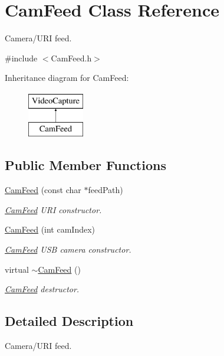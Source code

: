 \hypertarget{classCamFeed}{}\section{Cam\+Feed Class Reference}
\label{classCamFeed}


Camera/\+U\+R\+I feed.  




{\ttfamily \#include $<$Cam\+Feed.\+h$>$}

Inheritance diagram for Cam\+Feed\+:\begin{figure}[H]
\begin{center}
\leavevmode
\includegraphics[height=2.000000cm]{classCamFeed}
\end{center}
\end{figure}
\subsection*{Public Member Functions}
\begin{DoxyCompactItemize}
\item 
\hyperlink{classCamFeed_a31a519a9156f7e666e1907a535e35dc4}{Cam\+Feed} (const char $\ast$feed\+Path)
\begin{DoxyCompactList}\small\item\em \hyperlink{classCamFeed}{Cam\+Feed} U\+R\+I constructor. \end{DoxyCompactList}\item 
\hyperlink{classCamFeed_a9caf95eba6da1dcbc95e138168486423}{Cam\+Feed} (int cam\+Index)
\begin{DoxyCompactList}\small\item\em \hyperlink{classCamFeed}{Cam\+Feed} U\+S\+B camera constructor. \end{DoxyCompactList}\item 
virtual \hyperlink{classCamFeed_a2c03e00ea668e2f6b70cfcc91853ff84}{$\sim$\+Cam\+Feed} ()
\begin{DoxyCompactList}\small\item\em \hyperlink{classCamFeed}{Cam\+Feed} destructor. \end{DoxyCompactList}\end{DoxyCompactItemize}


\subsection{Detailed Description}
Camera/\+U\+R\+I feed. 

